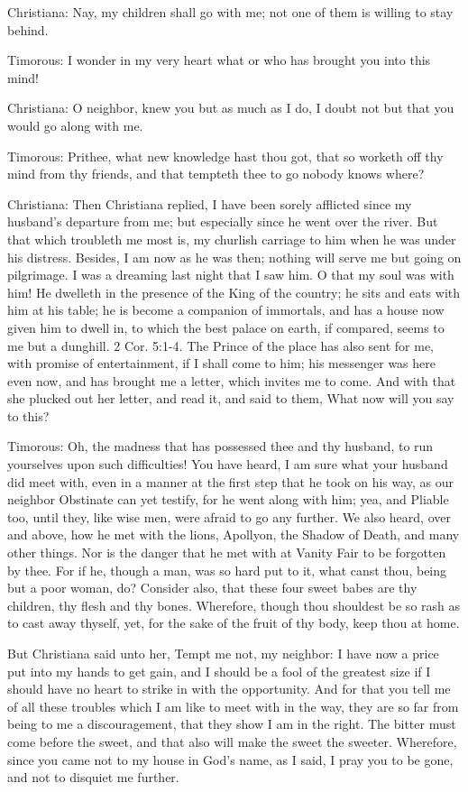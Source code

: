 Christiana: Nay, my children shall go with me; not one of them is willing to stay behind.

Timorous: I wonder in my very heart what or who has brought you into this mind!

Christiana: O neighbor, knew you but as much as I do, I doubt not but that you would go along with me.

Timorous: Prithee, what new knowledge hast thou got, that so worketh off thy mind from thy friends, and that tempteth thee to go nobody knows where?

Christiana: Then Christiana replied, I have been sorely afflicted since my husband's departure from me; but especially since he went over the river. But that which troubleth me most is, my churlish carriage to him when he was under his distress. Besides, I am now as he was then; nothing will serve me but going on pilgrimage. I was a dreaming last night that I saw him. O that my soul was with him! He dwelleth in the presence of the King of the country; he sits and eats with him at his table; he is become a companion of immortals, and has a house now given him to dwell in, to which the best palace on earth, if compared, seems to me but a dunghill. 2 Cor. 5:1-4. The Prince of the place has also sent for me, with promise of entertainment, if I shall come to him; his messenger was here even now, and has brought me a letter, which invites me to come. And with that she plucked out her letter, and read it, and said to them, What now will you say to this?

Timorous: Oh, the madness that has possessed thee and thy husband, to run yourselves upon such difficulties! You have heard, I am sure what your husband did meet with, even in a manner at the first step that he took on his way, as our neighbor Obstinate can yet testify, for he went along with him; yea, and Pliable too, until they, like wise men, were afraid to go any further. We also heard, over and above, how he met with the lions, Apollyon, the Shadow of Death, and many other things. Nor is the danger that he met with at Vanity Fair to be forgotten by thee. For if he, though a man, was so hard put to it, what canst thou, being but a poor woman, do? Consider also, that these four sweet babes are thy children, thy flesh and thy bones. Wherefore, though thou shouldest be so rash as to cast away thyself, yet, for the sake of the fruit of thy body, keep thou at home.

But Christiana said unto her, Tempt me not, my neighbor: I have now a price put into my hands to get gain, and I should be a fool of the greatest size if I should have no heart to strike in with the opportunity. And for that you tell me of all these troubles which I am like to meet with in the way, they are so far from being to me a discouragement, that they show I am in the right. The bitter must come before the sweet, and that also will make the sweet the sweeter. Wherefore, since you came not to my house in God's name, as I said, I pray you to be gone, and not to disquiet me further.

